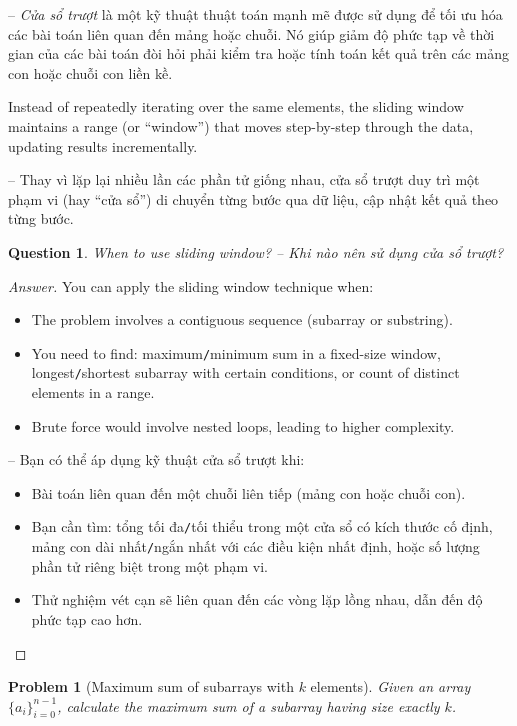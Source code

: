 \documentclass{article}
\newtheorem{problem}{Problem}
\newtheorem{question}{Question}
\begin{document}
-- {\it Cửa sổ trượt} là một kỹ thuật thuật toán mạnh mẽ được sử dụng để tối ưu hóa các bài toán liên quan đến mảng hoặc chuỗi. Nó giúp giảm độ phức tạp về thời gian của các bài toán đòi hỏi phải kiểm tra hoặc tính toán kết quả trên các mảng con hoặc chuỗi con liền kề.

Instead of repeatedly iterating over the same elements, the sliding window maintains a range (or ``window'') that moves step-by-step through the data, updating results incrementally.

-- Thay vì lặp lại nhiều lần các phần tử giống nhau, cửa sổ trượt duy trì một phạm vi (hay ``cửa sổ'') di chuyển từng bước qua dữ liệu, cập nhật kết quả theo từng bước.

\begin{question}
    When to use sliding window? -- Khi nào nên sử dụng cửa sổ trượt?
\end{question}

\begin{proof}[Answer]
    You can apply the sliding window technique when:
    \begin{itemize}
        \item The problem involves a contiguous sequence (subarray or substring).
        \item You need to find: maximum{\tt/}minimum sum in a fixed-size window, longest{\tt/}shortest subarray with certain conditions, or count of distinct elements in a range.
        \item Brute force would involve nested loops, leading to higher complexity.
    \end{itemize}
    -- Bạn có thể áp dụng kỹ thuật cửa sổ trượt khi:
    \begin{itemize}
        \item Bài toán liên quan đến một chuỗi liên tiếp (mảng con hoặc chuỗi con).
        \item Bạn cần tìm: tổng tối đa{\tt/}tối thiểu trong một cửa sổ có kích thước cố định, mảng con dài nhất{\tt/}ngắn nhất với các điều kiện nhất định, hoặc số lượng phần tử riêng biệt trong một phạm vi.
        \item Thử nghiệm vét cạn sẽ liên quan đến các vòng lặp lồng nhau, dẫn đến độ phức tạp cao hơn.
    \end{itemize}
\end{proof}

\begin{problem}[Maximum sum of subarrays with $k$ elements]
    Given an array $\{a_i\}_{i=0}^{n-1}$, calculate the maximum sum of a subarray having size exactly $k$.
\end{problem}
\end{document}
